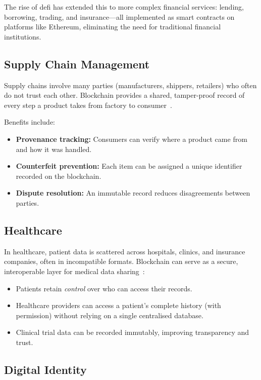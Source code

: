 The rise of \gls{defi} has extended this to more complex financial services: lending, borrowing, trading, and insurance---all implemented as smart contracts on platforms like Ethereum, eliminating the need for traditional financial institutions.

\subsection{Supply Chain Management}

Supply chains involve many parties (manufacturers, shippers, retailers) who often do not trust each other. Blockchain provides a shared, tamper-proof record of every step a product takes from factory to consumer~\cite{abeyratne2016supplychain}.

Benefits include:
\begin{itemize}
    \item \textbf{Provenance tracking:} Consumers can verify where a product came from and how it was handled.
    \item \textbf{Counterfeit prevention:} Each item can be assigned a unique identifier recorded on the blockchain.
    \item \textbf{Dispute resolution:} An immutable record reduces disagreements between parties.
\end{itemize}

\subsection{Healthcare}

In healthcare, patient data is scattered across hospitals, clinics, and insurance companies, often in incompatible formats. Blockchain can serve as a secure, interoperable layer for medical data sharing~\cite{azaria2016medrec}:
\begin{itemize}
    \item Patients retain \emph{control} over who can access their records.
    \item Healthcare providers can access a patient's complete history (with permission) without relying on a single centralised database.
    \item Clinical trial data can be recorded immutably, improving transparency and trust.
\end{itemize}

\subsection{Digital Identity}


